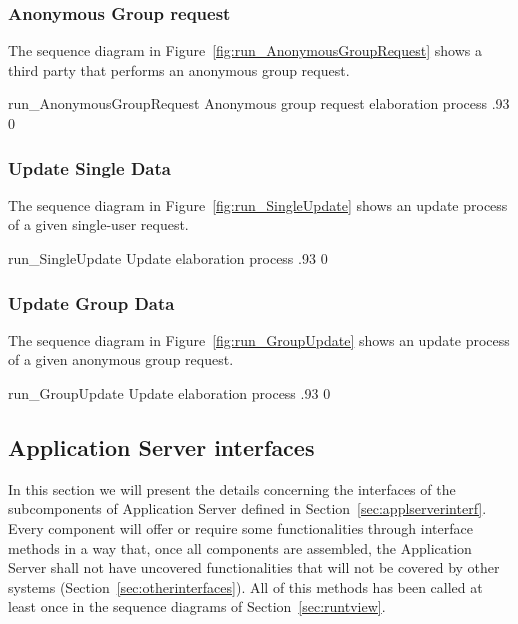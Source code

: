 \documentclass[../DD0.tex]{subfiles}
\begin{document}
    \clearpage
    \subsubsection{Anonymous Group request}
    \label{sec:anonymousgroup}

      The sequence diagram in Figure~\ref{fig:run_AnonymousGroupRequest} shows a third party that performs an anonymous group request.

      \fetchUML
        {run_AnonymousGroupRequest}
        {Anonymous group request elaboration process}
        {.93}           %
        {0}           %

    \clearpage

    \subsubsection{Update Single Data}
    \label{sec:updatesingledata}

      The sequence diagram in Figure~\ref{fig:run_SingleUpdate} shows an update process of a given single-user request.

      \fetchUML
        {run_SingleUpdate}
        {Update elaboration process}
        {.93}           %
        {0}           %

  \clearpage

  \subsubsection{Update Group Data}
    \label{sec:updatedata}

      The sequence diagram in Figure~\ref{fig:run_GroupUpdate} shows an update process of a given anonymous group request.

      \fetchUML
        {run_GroupUpdate}
        {Update elaboration process}
        {.93}           %
        {0}           %

  \clearpage

  \subsection{Application Server interfaces}
  \label{sec:compinterf}

    In this section we will present the details concerning the interfaces of the subcomponents of Application Server defined in Section~\ref{sec:applserverinterf}. Every component will offer or require some functionalities through interface methods in a way that, once all components are assembled, the Application Server shall not have uncovered functionalities that will not be covered by other systems (Section~\ref{sec:otherinterfaces}). All of this methods has been called at least once in the sequence diagrams of Section~\ref{sec:runtview}.
\end{document}
